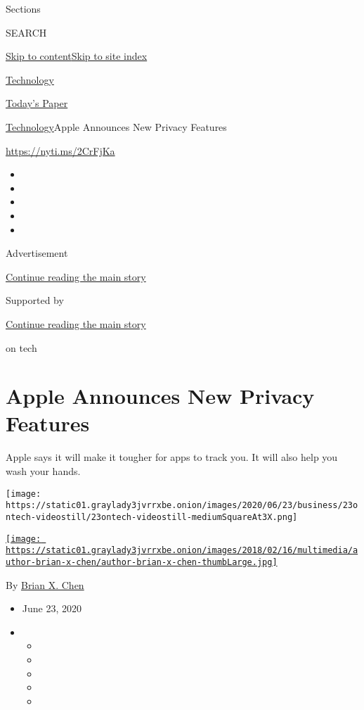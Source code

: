 Sections

SEARCH

\protect\hyperlink{site-content}{Skip to
content}\protect\hyperlink{site-index}{Skip to site index}

\href{https://www.nytimes3xbfgragh.onion/section/technology}{Technology}

\href{https://myaccount.nytimes3xbfgragh.onion/auth/login?response_type=cookie\&client_id=vi}{}

\href{https://www.nytimes3xbfgragh.onion/section/todayspaper}{Today's
Paper}

\href{/section/technology}{Technology}\textbar{}Apple Announces New
Privacy Features

\url{https://nyti.ms/2CrFjKa}

\begin{itemize}
\item
\item
\item
\item
\item
\end{itemize}

Advertisement

\protect\hyperlink{after-top}{Continue reading the main story}

Supported by

\protect\hyperlink{after-sponsor}{Continue reading the main story}

on tech

\hypertarget{apple-announces-new-privacy-features}{%
\section{Apple Announces New Privacy
Features}\label{apple-announces-new-privacy-features}}

Apple says it will make it tougher for apps to track you. It will also
help you wash your hands.

\texttt{[image: https://static01.graylady3jvrrxbe.onion/images/2020/06/23/business/23ontech-videostill/23ontech-videostill-mediumSquareAt3X.png]}

\href{https://www.nytimes3xbfgragh.onion/by/brian-x-chen}{\texttt{[image: https://static01.graylady3jvrrxbe.onion/images/2018/02/16/multimedia/author-brian-x-chen/author-brian-x-chen-thumbLarge.jpg]}}

By \href{https://www.nytimes3xbfgragh.onion/by/brian-x-chen}{Brian X.
Chen}

\begin{itemize}
\item
  June 23, 2020
\item
  \begin{itemize}
  \item
  \item
  \item
  \item
  \item
  \end{itemize}
\end{itemize}

